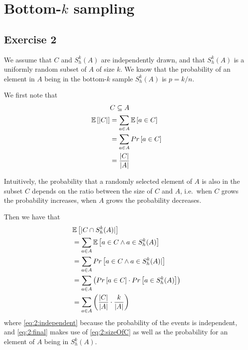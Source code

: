\section{Bottom-$k$ sampling}

\subsection{Exercise 2}
We assume that $C$ and $S_h^k(A)$ are independently drawn, and that $S_h^k(A)$ is a uniformly
random subset of $A$ of size $k$. We know that the probability of an element in $A$ being
in the bottom-$k$ sample $S_h^k(A)$ is $p=k/n$.

We first note that
\begin{align}
  & C \subseteq A \notag \\
  \mathbb{E}\left[|C|\right] &= \sum_{a\in A} \mathbb{E}\left[ a\in C\right] \notag \\
  &= \sum_{a\in A} Pr\left[ a \in C \right] \notag \\
  &= \frac{|C|}{|A|} \label{eq:2:sizeOfC}
\end{align}

Intuitively, the probability that a randomly selected element of $A$ is also in the subset $C$
depends on the ratio between the size of $C$ and $A$, i.e.\ when $C$ grows the probability increases,
when $A$ grows the probability decreases.

Then we have that
\begin{align}
  & \mathbb{E} \left[ | C \cap S_h^k(A) | \right] \notag \\
  &= \sum_{a\in A} \mathbb{E}\left[ a \in C \land a \in S_h^k(A) \right] \notag \\
  &= \sum_{a\in A} Pr\left[ a \in C \land a \in S_h^k(A) | \right] \notag \\
  &= \sum_{a\in A} \left( Pr\left[ a \in C \right] \cdot Pr\left[ a \in S_h^k(A) \right] \right) 
    \label{eq:2:independent} \\
  &= \sum_{a\in A} \left( \frac{|C|}{|A|} \cdot \frac{k}{|A|} \right) \label{eq:2:final}
\end{align}
where \eqref{eq:2:independent} because the probability of the events is independent, and \eqref{eq:2:final} makes use of \eqref{eq:2:sizeOfC} as well as the probability for an element of
$A$ being in $S_h^k(A)$.

